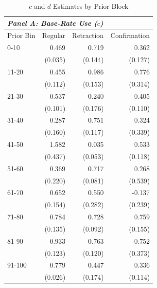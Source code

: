 \begin{table}[htbp]
\centering
\caption{$c$ and $d$ Estimates by Prior Block}
\label{tab:cd_by_prior}
\begin{tabular}{lrrr}
\hline
\multicolumn{4}{l}{\textit{Panel A: Base-Rate Use ($c$)}} \\
\hline
Prior Bin & Regular & Retraction & Confirmation \\
\hline
0-10 & 0.469 & 0.719 & 0.362
 \\
 & (0.035) & (0.144) & (0.127)
 \\
11-20 & 0.455 & 0.986 & 0.776
 \\
 & (0.112) & (0.153) & (0.314)
 \\
21-30 & 0.537 & 0.240 & 0.405
 \\
 & (0.101) & (0.176) & (0.110)
 \\
31-40 & 0.287 & 0.751 & 0.324
 \\
 & (0.160) & (0.117) & (0.339)
 \\
41-50 & 1.582 & 0.035 & 0.533
 \\
 & (0.437) & (0.053) & (0.118)
 \\
51-60 & 0.369 & 0.717 & 0.268
 \\
 & (0.220) & (0.081) & (0.539)
 \\
61-70 & 0.652 & 0.550 & -0.137
 \\
 & (0.154) & (0.282) & (0.239)
 \\
71-80 & 0.784 & 0.728 & 0.759
 \\
 & (0.135) & (0.092) & (0.155)
 \\
81-90 & 0.933 & 0.763 & -0.752
 \\
 & (0.123) & (0.120) & (0.373)
 \\
91-100 & 0.779 & 0.447 & 0.336
 \\
 & (0.026) & (0.174) & (0.114)
 \\
\hline


\end{tabular}
\end{table}
